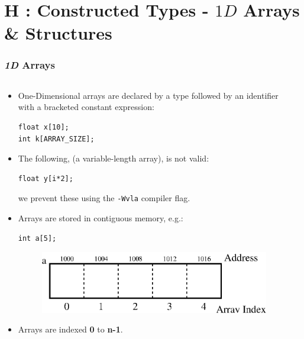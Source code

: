 \section{H : Constructed Types - $1D$ Arrays \& Structures }
\label{chap:contypes}

\begin{frame}[fragile]
\frametitle{{\em 1D} Arrays}

\begin{columns}

\begin{column}{0.55\textwidth}
\begin{itemize}[<+->]
\item One-Dimensional arrays are declared by a type
followed by an identifier with a bracketed constant expression:
{\small
\begin{verbatim}
float x[10];
int k[ARRAY_SIZE];
\end{verbatim}
}
\item The following, (a variable-length array), is not valid:
{\small
\begin{verbatim}
float y[i*2];
\end{verbatim}
}
we prevent these using the \verb^-Wvla^ compiler flag.
\item Arrays are stored in contiguous memory, e.g.:
{\small
\begin{verbatim}
int a[5];
\end{verbatim}
}
\begin{center}
\begin{figure}[h]
\centerline{
\includegraphics[scale=0.40]{../Figs/array9_1.eps}
}
\end{figure}
\end{center}
\item Arrays are indexed {\bf 0} to {\bf n-1}.
\end{itemize}

\end{column}

\pause
\begin{column}{0.35\textwidth}

\end{column}

\end{columns}
\end{frame}

